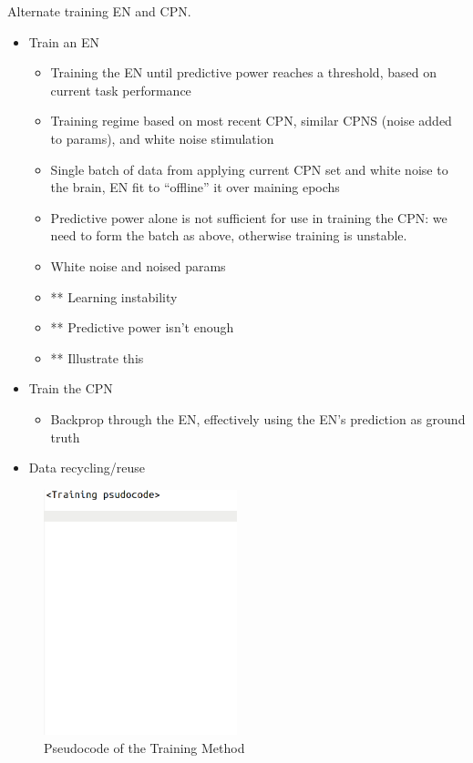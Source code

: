 \documentclass[12pt]{iopart}
\begin{document}
Alternate training EN and CPN.
\begin{itemize}
	\item Train an EN
		\begin{itemize}
			\item Training the EN until predictive power reaches a threshold, based on current task performance
			\item Training regime based on most recent CPN, similar CPNS (noise added to params), and white noise stimulation
			\item Single batch of data from applying current CPN set and white noise to the brain, EN fit to ``offline'' it over maining epochs
			\item Predictive power alone is not sufficient for use in training the CPN: we need to form the batch as above, otherwise training is unstable.
			\item White noise and noised params
			\item ** Learning instability
			\item ** Predictive power isn't enough
			\item ** Illustrate this
		\end{itemize}
	\item Train the CPN
		\begin{itemize}
			\item Backprop through the EN, effectively using the EN's prediction as ground truth
		\end{itemize}

	\item Data recycling/reuse
\end{itemize}

\begin{figure}[h]
\includegraphics[width=0.5\textwidth]{pseudocode.png}
\caption{Pseudocode of the Training Method}
\centering
\label{fig:pseudocode}
\end{figure}
\end{document}
